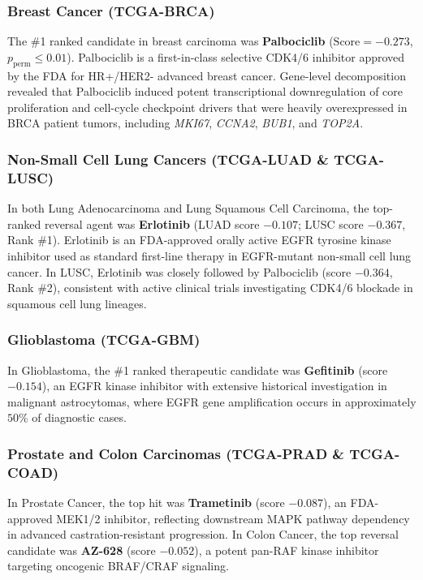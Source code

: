 \documentclass[10pt,journal,compsoc,twocolumn]{IEEEtran}
\begin{document}
\subsubsection{Breast Cancer (TCGA-BRCA)}
The \#1 ranked candidate in breast carcinoma was \textbf{Palbociclib} ($\text{Score} = -0.273$, $p_{\text{perm}} \le 0.01$). Palbociclib is a first-in-class selective CDK4/6 inhibitor approved by the FDA for HR+/HER2- advanced breast cancer. Gene-level decomposition revealed that Palbociclib induced potent transcriptional downregulation of core proliferation and cell-cycle checkpoint drivers that were heavily overexpressed in BRCA patient tumors, including \textit{MKI67}, \textit{CCNA2}, \textit{BUB1}, and \textit{TOP2A}.

\subsubsection{Non-Small Cell Lung Cancers (TCGA-LUAD \& TCGA-LUSC)}
In both Lung Adenocarcinoma and Lung Squamous Cell Carcinoma, the top-ranked reversal agent was \textbf{Erlotinib} (LUAD score $-0.107$; LUSC score $-0.367$, Rank \#1). Erlotinib is an FDA-approved orally active EGFR tyrosine kinase inhibitor used as standard first-line therapy in EGFR-mutant non-small cell lung cancer. In LUSC, Erlotinib was closely followed by Palbociclib (score $-0.364$, Rank \#2), consistent with active clinical trials investigating CDK4/6 blockade in squamous cell lung lineages.

\subsubsection{Glioblastoma (TCGA-GBM)}
In Glioblastoma, the \#1 ranked therapeutic candidate was \textbf{Gefitinib} (score $-0.154$), an EGFR kinase inhibitor with extensive historical investigation in malignant astrocytomas, where EGFR gene amplification occurs in approximately $50\%$ of diagnostic cases.

\subsubsection{Prostate and Colon Carcinomas (TCGA-PRAD \& TCGA-COAD)}
In Prostate Cancer, the top hit was \textbf{Trametinib} (score $-0.087$), an FDA-approved MEK1/2 inhibitor, reflecting downstream MAPK pathway dependency in advanced castration-resistant progression. In Colon Cancer, the top reversal candidate was \textbf{AZ-628} (score $-0.052$), a potent pan-RAF kinase inhibitor targeting oncogenic BRAF/CRAF signaling.
\end{document}
